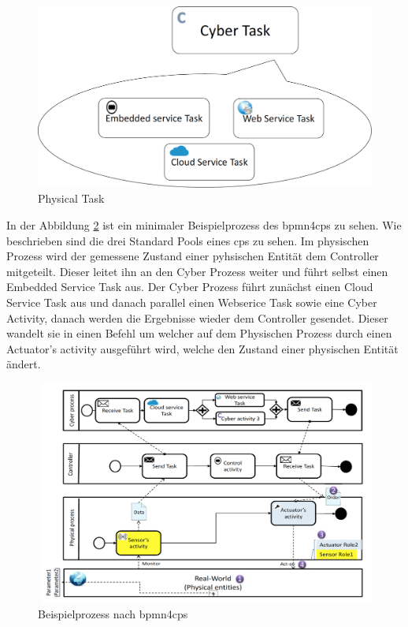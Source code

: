 \documentclass[a4paper, 12pt, twoside, headsepline=true]{scrartcl} %
\begin{document}
\begin{figure}[H]
	\includegraphics[height=4 cm,keepaspectratio,center]{figures/CyberTask}
	\caption{Physical Task\cite{BMPN4CPS}}
	\label{fig:cybertask}
\end{figure} 

In der Abbildung \ref{fig:bpmn4cpsProcess} ist ein minimaler Beispielprozess des \ac{bpmn4cps} zu sehen. Wie beschrieben sind die drei Standard Pools eines \ac{cps} zu sehen. Im physischen Prozess wird der gemessene Zustand einer pyhsischen Entität dem Controller mitgeteilt. Dieser leitet ihn an den Cyber Prozess weiter und führt selbst einen Embedded Service Task aus. Der Cyber Prozess führt zunächst einen Cloud Service Task aus und danach parallel einen Webserice Task sowie eine Cyber Activity, danach werden die Ergebnisse wieder dem Controller gesendet. Dieser wandelt sie in einen Befehl um welcher auf dem Physischen Prozess durch einen Actuator's activity ausgeführt wird, welche den Zustand einer physischen Entität ändert. 

\begin{figure}[H]
	\includegraphics[height=12 cm,keepaspectratio,center]{figures/bpmn4cpsProcess}
	\caption{Beispielprozess nach \ac{bpmn4cps} \cite{BMPN4CPS}}
	\label{fig:bpmn4cpsProcess}
\end{figure} 
\end{document}

